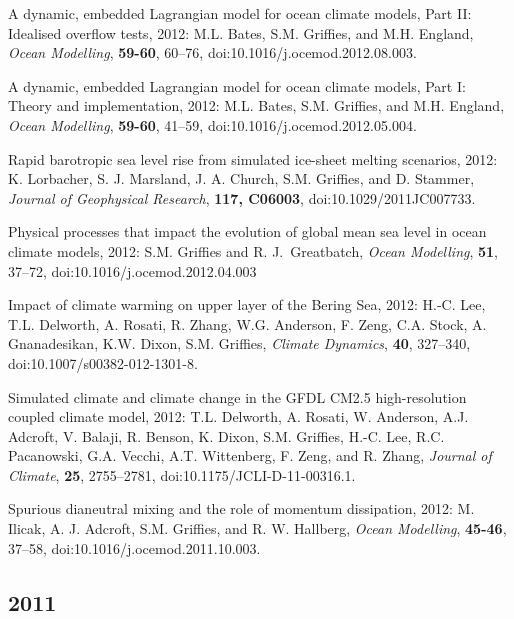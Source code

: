\begin{etaremune}
\item A dynamic, embedded Lagrangian model for ocean climate models,  Part II: Idealised overflow tests, 2012: M.L. Bates, S.M. Grif\/f\/ies, and M.H. England, {\it Ocean Modelling}, {\bf
    59-60}, 60--76, doi:10.1016/j.ocemod.2012.08.003.

\item A dynamic, embedded Lagrangian model for ocean climate models, Part I: Theory and implementation, 2012: M.L. Bates, S.M. Grif\/f\/ies, and M.H. England, {\it Ocean Modelling}, {\bf  59-60}, 41--59, doi:10.1016/j.ocemod.2012.05.004.

\item Rapid barotropic sea level rise from simulated ice-sheet melting  scenarios, 2012: K. Lorbacher, S. J. Marsland, J. A. Church, S.M. Grif\/f\/ies, and D. Stammer, {\it Journal of Geophysical Research}, {\bf 117, C06003}, doi:10.1029/2011JC007733.

\item Physical processes that impact the evolution of global mean sea  level in ocean climate models, 2012: S.M. Grif\/f\/ies and R. J.\  Greatbatch, {\it Ocean Modelling}, {\bf 51}, 37--72,  doi:10.1016/j.ocemod.2012.04.003

\item Impact of climate warming on upper layer of the Bering Sea, 2012: H.-C. Lee, T.L. Delworth, A. Rosati, R. Zhang, W.G. Anderson,  F. Zeng, C.A. Stock, A. Gnanadesikan, K.W. Dixon, S.M. Grif\/f\/ies, {\it Climate Dynamics}, {\bf 40}, 327–340,
\\  doi:10.1007/s00382-012-1301-8.

\item Simulated climate and climate change in the GFDL CM2.5 high-resolution coupled climate model, 2012: T.L. Delworth,  A. Rosati, W. Anderson, A.J. Adcroft, V. Balaji, R. Benson,  K. Dixon, S.M. Grif\/f\/ies, H.-C. Lee, R.C. Pacanowski,  G.A. Vecchi, A.T. Wittenberg, F. Zeng, and R. Zhang, {\it Journal of  Climate}, {\bf 25}, 2755--2781, doi:10.1175/JCLI-D-11-00316.1.

\item Spurious dianeutral mixing and the role of momentum dissipation, 2012: M. Ilicak, A. J. Adcroft, S.M. Grif\/f\/ies, and  R. W. Hallberg, {\it Ocean Modelling}, {\bf 45-46}, 37--58,  doi:10.1016/j.ocemod.2011.10.003.

\subsection*{\sc \color{Maroon} 2011}


\end{etaremune}
